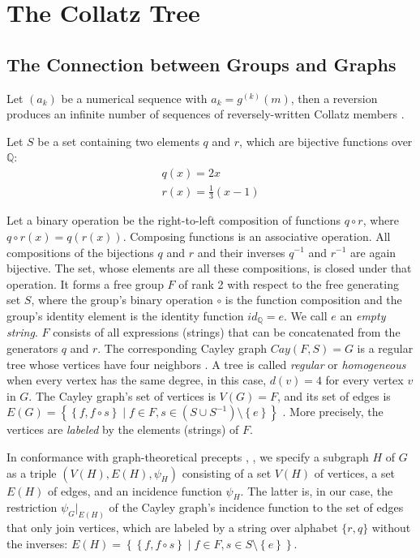 \chapter{The Collatz Tree}

\section{The Connection between Groups and Graphs}
\label{sec:groups_graphs}
Let $(a_k)$ be a numerical sequence with $a_k=g^{(k)}(m)$, then a reversion produces an infinite number of sequences of reversely-written Collatz members \cite{Ref_Klisse_2010}.

Let $S$ be a set containing two elements $q$ and $r$, which are bijective functions over $\mathbb{Q}$:
\begin{equation}
\begin{array}{l}
q(x)=2x \\ 
r(x)=\frac{1}{3}(x-1)
\end{array}
\end{equation}

Let a binary operation be the right-to-left composition of functions $q\circ r$, where $q\circ r(x)=q(r(x))$. Composing functions is an associative operation. All compositions of the bijections $q$ and $r$ and their inverses $q^{-1}$ and $r^{-1}$ are again bijective. The set, whose elements are all these compositions, is closed under that operation. It forms a free group $F$ of rank 2 with respect to the free generating set $S$, where the group's binary operation $\circ$ is the function composition and the group's identity element is the identity function $id_{\mathbb{Q}}=e$. We call $e$ an \textit{empty string}. $F$ consists of all expressions (strings) that can be concatenated from the generators $q$ and $r$. The corresponding Cayley graph $Cay(F,S)=G$ is a regular tree whose vertices have four neighbors \cite[p.~66]{Ref_Loeh}. A tree is called \textit{regular} or \textit{homogeneous} when every vertex has the same degree, in this case, $d(v)=4$ for every vertex $v$ in $G$. The Cayley graph's set of vertices is $V(G)=F$, and its set of edges is $E(G)=\left\{\left\{f,f\circ s\right\}\mid f\in F,s\in\left(S\cup S^{-1}\right)\setminus\left\{e\right\}\right\}$ \cite[p.~57]{Ref_Loeh}. More precisely, the vertices are \textit{labeled} by the elements (strings) of $F$.

In conformance with graph-theoretical precepts \cite{Ref_Bondy_Murty},
\cite{Ref_Bonnington_Little}, \cite{Ref_Bender_Williamson}
we specify a subgraph $H$ of $G$ as a triple $\left(V(H),E(H),\psi_{H}\right)$ consisting of a set $V(H)$ of vertices, a set $E(H)$ of edges, and an incidence function $\psi_{H}$. The latter is, in our case, the restriction $\psi_{G}\vert_{E(H)}$ of the Cayley graph's incidence function to the set of edges that only join vertices, which are labeled by a string over alphabet $\{r,q\}$ without the inverses: $E(H)=\left\{\left\{f,f\circ s\right\}\mid f\in F,s\in S\setminus\left\{e
\right\}\right\}$.

